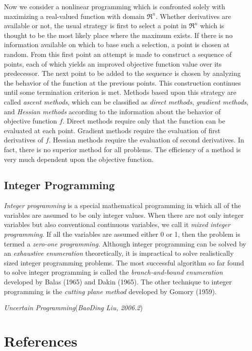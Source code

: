 Now we consider a nonlinear programming which is confronted solely with maximizing a real-valued function with domain $\Re^n$.
Whether derivatives are available or not,
the usual strategy is first to select a point in $\Re^n$ which is thought to be the most likely place where the maximum exists.
If there is no information available on which to base such a selection, a point is chosen at random.
From this first point an attempt is made to construct a sequence of points,
each of which yields an improved objective function value over its predecessor.
The next point to be added to the sequence is chosen by analyzing the behavior of the function at the previous points.
This construction continues until some termination criterion is met.
Methods based upon this strategy are called {\em ascent methods},
which can be classified as {\em direct methods},
{\em gradient methods},
and {\em Hessian methods} according to the information about the behavior of objective function $f$.
Direct methods require only that the function can be evaluated at each point.
Gradient methods require the evaluation of first derivatives of $f$.
Hessian methods require the evaluation of second derivatives.
In fact, there is no superior method for all problems.
The efficiency of a method is very much dependent upon the objective function.

\subsection{Integer Programming}

{\em Integer programming} is a special mathematical programming in which all of the variables are assumed to be only integer values.
When there are not only integer variables but also conventional continuous variables,
we call it {\em mixed integer programming}.
If all the variables are assumed either 0 or 1,
then the problem is termed a {\em zero-one programming}.
Although integer programming can be solved by an {\em exhaustive enumeration} theoretically,
it is impractical to solve realistically sized integer programming problems.
The most successful algorithm so far found to solve integer programming is called the {\em branch-and-bound enumeration} developed by Balas (1965) and Dakin (1965).
The other technique to integer programming is the {\em cutting plane method} developed by Gomory (1959).

\hfill\textit{Uncertain Programming\/}\quad(\textsl{BaoDing Liu, 2006.2})

\section*{References}

